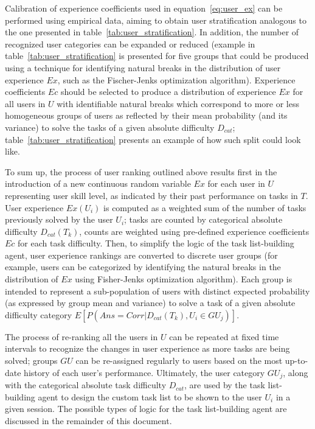 Calibration of experience coefficients used in equation~\ref{eq:user_ex} can be performed using empirical data, aiming to obtain user stratification analogous to the one presented in table~\ref{tab:user_stratification}.
In addition, the number of recognized user categories can be expanded or reduced (example in table~\ref{tab:user_stratification} is presented for five groups that could be produced using a technique for identifying natural breaks in the distribution of user experience $Ex$, such as the Fischer-Jenks optimization algorithm).
Experience coefficients $Ec$ should be selected to produce a distribution of experience $Ex$ for all users in $U$ with identifiable natural breaks which correspond to more or less homogeneous groups of users as reflected by their mean probability (and its variance) to solve the tasks of a given absolute difficulty $D_{cat}$;
table~\ref{tab:user_stratification} presents an example of how such split could look like.

To sum up, the process of user ranking outlined above results first in the introduction of a new continuous random variable $Ex$ for each user in $U$ representing user skill level, as indicated by their past performance on tasks in $T$.
User experience $Ex(U_i)$ is computed as a weighted sum of the number of tasks previously solved by the user $U_i$;
tasks are counted by categorical absolute difficulty $D_{cat}(T_k)$, counts are weighted using pre-defined experience coefficients $Ec$ for each task difficulty.
Then, to simplify the logic of the task list-building agent, user experience rankings are converted to discrete user groups (for example, users can be categorized by identifying the natural breaks in the distribution of $Ex$ using Fisher-Jenks optimization algorithm).
Each group is intended to represent a sub-population of users with distinct expected probability (as expressed by group mean and variance) to solve a task of a given absolute difficulty category $E[P(Ans=Corr|D_{cat}(T_k), U_i \in GU_j)]$.

The process of re-ranking all the users in $U$ can be repeated at fixed time intervals to recognize the changes in user experience as more tasks are being solved;
groups $GU$ can be re-assigned regularly to users based on the most up-to-date history of each user's performance.
Ultimately, the user category $GU_j$, along with the categorical absolute task difficulty $D_{cat}$, are used by the task list-building agent to design the custom task list to be shown to the user $U_i$ in a given session.
The possible types of logic for the task list-building agent are discussed in the remainder of this document.

